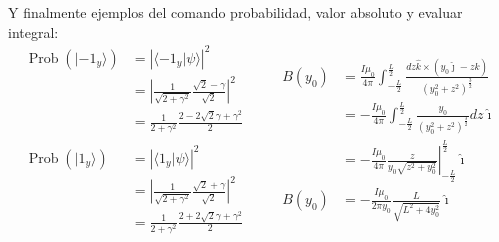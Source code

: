 \documentclass[11pt,letterpaper]{article}
\DeclareMathOperator{\probabi}{Prob}               %
\newcommand{\prob}[1]{\probabi\left( #1 \right)}   %
\newcommand{\abs}[1]{\left|#1\right|}              %
\newcommand{\ket}[1]{| #1 \rangle}                 %
\newcommand{\braket}[2]{\langle #1 | #2 \rangle}   %
\newcommand{\eval}[3]{\left.#1\right|_{#2}^{#3}}   %
\begin{document}
Y finalmente ejemplos del comando probabilidad, valor absoluto y evaluar integral:
\begin{equation*}
    \begin{split}
        \prob{\ket{-1_y}} &= \abs{\braket{-1_y}{\psi}}^2\\
        &= \abs{\frac{1}{\sqrt{2+\gamma^2}}\frac{\sqrt{2} - \gamma}{\sqrt{2}}}^2\\
        &= \frac{1}{2+\gamma^2}\frac{2-2\sqrt{2}\gamma + \gamma^2}{2}\\
         \\
        \prob{\ket{1_y}} &= \abs{\braket{1_y}{\psi}}^2\\
        &= \abs{\frac{1}{\sqrt{2+\gamma^2}}\frac{\sqrt{2} + \gamma}{\sqrt{2}}}^2\\
        &= \frac{1}{2+\gamma^2}\frac{2+2\sqrt{2}\gamma + \gamma^2}{2}
    \end{split}
    \qquad
    \begin{split}
        B(y_0) &= \frac{I\mu_0}{4\pi}\int_{-\frac{L}{2}}^{\frac{L}{2}} \frac{dz\hat{k}\times(y_0\hat{\jmath} - z\hat{k})}{(y_0^2 + z^2)^{\frac{3}{2}}}\\
        &= -\frac{I\mu_0}{4\pi}\int_{-\frac{L}{2}}^{\frac{L}{2}} \frac{y_0}{(y_0^2 + z^2)^{\frac{3}{2}}}dz\hat{\imath}\\
        &= -\frac{I\mu_0}{4\pi}\eval{\frac{z}{y_0\sqrt{z^2+y_0^2}}}{-\frac{L}{2}}{\frac{L}{2}}\hat{\imath}\\
        B(y_0) &= -\frac{I\mu_0}{2\pi y_0}\frac{L}{\sqrt{L^2 + 4y_0^2}}\hat{\imath}
    \end{split}
\end{equation*}
\end{document}
